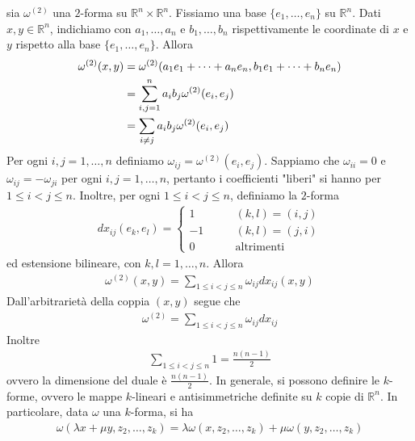 \documentclass[oneside, 11pt]{amsbook}
\makeatletter
\newcommand{\0}{{(0)}}
\newcommand{\3}{{(3)}}
\theoremstyle{colonplain}
\theoremstyle{colondefinition}
\theoremstyle{colonremark}
\numberwithin{equation}{chapter}
\renewcommand{\proofname}{Dimostrazione}
\renewenvironment{proof}[1][\proofname]{\par
  \pushQED{\qed}%
  \normalfont \topsep6\p@\@plus6\p@\relax
  \trivlist
  \item[\hskip\labelsep\bfseries #1:]\ignorespaces
}{%
  \popQED\endtrivlist\@endpefalse
}
\makeatother
\begin{document}
\begin{proof} sia $\omega^{(2)}$ una $2$-forma su $\mathbb{R}^n \times \mathbb{R}^n$. Fissiamo una base $\{e_1, \dots, e_n\}$ su $\mathbb{R}^n$. Dati $x, y \in \mathbb{R}^n$, indichiamo con $a_1, \dots, a_n$ e $b_1, \dots, b_n$ rispettivamente le coordinate di $x$ e $y$ rispetto alla base $\{e_1, \dots, e_n\}$. Allora 
\begin{align}
    \omega^{(2)}(x, y) &= \omega^{(2)}(a_1e_1 + \dots + a_ne_n, b_1e_1 + \dots + b_ne_n) \notag \\
    &= \sum_{i,j = 1}^n a_ib_j\omega^{(2)}(e_i, e_j) \notag \\
    &= \sum_{i \neq j} a_ib_j\omega^{(2)}(e_i, e_j) \notag
\end{align}
Per ogni $i,j = 1, \dots, n$ definiamo $\omega_{ij} = \omega^{(2)}(e_i, e_j)$. Sappiamo che $\omega_{ii} = 0$ e $\omega_{ij} = -\omega_{ji}$ per ogni $i, j = 1, \dots, n$, pertanto i coefficienti "liberi" si hanno per $1 \leq i < j \leq n$. Inoltre, per ogni $1 \leq i < j \leq n$, definiamo la $2$-forma 
\begin{align}
    dx_{ij}(e_k, e_l) = \begin{cases}
        1 \qquad &(k, l) = (i, j) \\
        -1 \qquad &(k, l) = (j, i) \\
        0 \qquad &\text{altrimenti}
    \end{cases}
\end{align}
ed estensione bilineare, con $k, l = 1, \dots, n$. Allora 
\begin{align}
    \omega^{(2)}(x, y) = \sum_{1 \leq i < j \leq n}\omega_{ij}dx_{ij}(x, y)
\end{align}
Dall'arbitrarietà della coppia $(x, y)$ segue che 
\begin{align}
    \omega^{(2)} = \sum_{1 \leq i < j \leq n} \omega_{ij}dx_{ij}
\end{align}
Inoltre 
\begin{align}
    \sum_{1 \leq i < j \leq n} 1 = \frac{n(n - 1)}{2}
\end{align}
ovvero la dimensione del duale è $\frac{n(n - 1)}{2}$.
\end{proof}
In generale, si possono definire le $k$-forme, ovvero le mappe $k$-lineari e antisimmetriche definite su $k$ copie di $\mathbb{R}^n$. In particolare, data $\omega$ una $k$-forma, si ha 
\begin{align}
    \omega(\lambda x + \mu y, z_2, \dots, z_k) = \lambda\omega(x, z_2, \dots, z_k) + \mu\omega(y, z_2, \dots, z_k)
\end{align}
\end{document}
